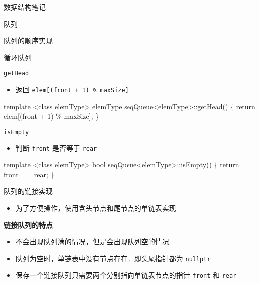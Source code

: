 \documentclass[
  ignorenonframetext,
]{beamer}
\newenvironment{Shaded}{}{}
\newcommand{\NormalTok}[1]{#1}
\providecommand{\tightlist}{%
  \setlength{\itemsep}{0pt}\setlength{\parskip}{0pt}}
\begin{document}
\begin{frame}[fragile]{数据结构笔记}
\begin{block}{队列}
\begin{block}{队列的顺序实现}
\begin{block}{循环队列}
\begin{block}{\texttt{getHead}}
\protect{}\label{gethead}
\begin{itemize}
\tightlist
\item
  返回 \texttt{elem{[}(front\ +\ 1)\ \%\ maxSize{]}}
\end{itemize}

\begin{Shaded}
\begin{Highlighting}[]
\NormalTok{template \textless{}class elemType\textgreater{}}
\NormalTok{elemType seqQueue\textless{}elemType\textgreater{}::getHead()}
\NormalTok{\{}
\NormalTok{  return elem[(front + 1) \% maxSize];}
\NormalTok{\}}
\end{Highlighting}
\end{Shaded}
\end{block}

\begin{block}{\texttt{isEmpty}}
\protect{}\label{isempty-2}
\begin{itemize}
\tightlist
\item
  判断 \texttt{front} 是否等于 \texttt{rear}
\end{itemize}

\begin{Shaded}
\begin{Highlighting}[]
\NormalTok{template \textless{}class elemType\textgreater{}}
\NormalTok{bool seqQueue\textless{}elemType\textgreater{}::isEmpty()}
\NormalTok{\{}
\NormalTok{  return front == rear;}
\NormalTok{\}}
\end{Highlighting}
\end{Shaded}
\end{block}
\end{block}
\end{block}

\begin{block}{队列的链接实现}
\protect{}\label{ux961fux5217ux7684ux94feux63a5ux5b9eux73b0}
\begin{itemize}
\tightlist
\item
  为了方便操作，使用含头节点和尾节点的单链表实现
\end{itemize}


\textbf{链接队列的特点}

\begin{itemize}
\tightlist
\item
  不会出现队列满的情况，但是会出现队列空的情况
\item
  队列为空时，单链表中没有节点存在，即头尾指针都为 \texttt{nullptr}
\item
  保存一个链接队列只需要两个分别指向单链表节点的指针 \texttt{front} 和
  \texttt{rear}


\end{itemize}
\end{block}
\end{block}
\end{frame}
\end{document}
